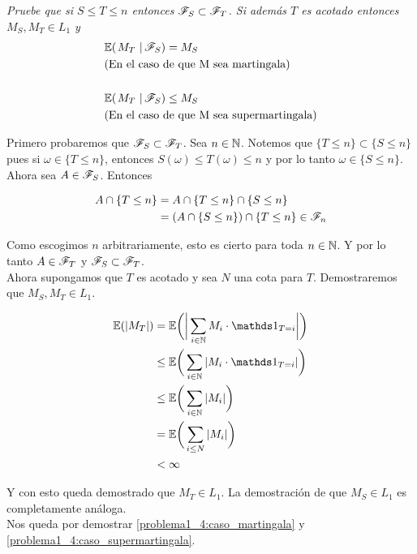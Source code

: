 \emph{
	Pruebe que si $S\leq T\leq n$ entonces $\mathscr{F}_S\subset\mathscr{F}_T$. Si además $T$ es acotado entonces $M_S,M_T \in L_1$ y 
	\begin{align}
		&\espc{M_T}{\F_S} = M_S \label{problema1_4:caso_martingala} 			\\
		&\mbox{(En el caso de que M sea martingala)} 
		\\
		\\
		&\espc{M_T}{\F_S}\leq M_S \label{problema1_4:caso_supermartingala}	\\
		&\mbox{(En el caso de que M sea supermartingala)} 
	\end{align}	
}

	Primero probaremos que $\mathscr{F}_S \subset \mathscr{F}_T$. Sea $n \in \mathbb{N}$. Notemos que $\{ T \leq n \} \subset \{ S \leq n \}$ pues
	si $\omega \in \{ T \leq n \}$, entonces $S(\omega) \leq T(\omega) \leq n $ y por lo tanto $\omega \in \{ S \leq n \}$.\\

	Ahora sea $A \in \mathscr{F}_S$. Entonces

	\begin{align}
		A \cap \{ T \leq n \} 	&=		A  \cap \{ T \leq n \} \cap \{ S \leq n \} \\
								&=		(A  \cap \{ S \leq n \}) \cap \{ T \leq n \} \in \mathscr{F}_n
	\end{align}

	Como escogimos $n$ arbitrariamente, esto es cierto para toda $n \in \mathbb{N}$. Y por lo tanto $A \in \mathscr{F}_T$ y $\mathscr{F}_S \subset \mathscr{F}_T$.\\

	Ahora supongamos que $T$ es acotado y sea $N$ una cota para $T$. Demostraremos que $M_S,M_T \in L_1$.
	
	\begin{align}
		\E(|M_T|) 	&=		\E\bigg(	\bigg| \sum_{i \in \N} M_i \cdot \indic_{T = i} \bigg|	\bigg) \\ 
					&\leq	\E\bigg(	\sum_{i \in \N} |M_i \cdot \indic_{T = i} |				\bigg) \\
					&\leq	\E\bigg(	\sum_{i \in \N} |M_i|									\bigg) \\
					&=		\E\bigg(	\sum_{i \leq N} |M_i|									\bigg) \\
					&< 		\infty
	\end{align}
	
	Y con esto queda demostrado que $M_T \in L_1$. La demostración de que $M_S \in L_1$ es completamente análoga.\\
	
	Nos queda por demostrar \eqref{problema1_4:caso_martingala} y \eqref{problema1_4:caso_supermartingala}.\\
	
